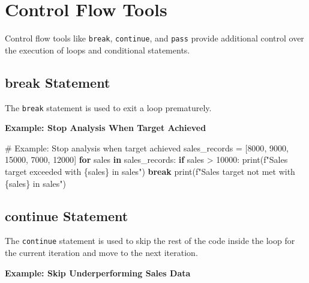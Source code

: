 \documentclass[
  letterpaper,
  DIV=11,
  numbers=noendperiod]{scrreprt}
\newenvironment{Shaded}{\begin{snugshade}}{\end{snugshade}}
\newcommand{\BuiltInTok}[1]{\textcolor[rgb]{0.00,0.23,0.31}{#1}}
\newcommand{\CommentTok}[1]{\textcolor[rgb]{0.37,0.37,0.37}{#1}}
\newcommand{\ControlFlowTok}[1]{\textcolor[rgb]{0.00,0.23,0.31}{\textbf{#1}}}
\newcommand{\DecValTok}[1]{\textcolor[rgb]{0.68,0.00,0.00}{#1}}
\newcommand{\KeywordTok}[1]{\textcolor[rgb]{0.00,0.23,0.31}{\textbf{#1}}}
\newcommand{\NormalTok}[1]{\textcolor[rgb]{0.00,0.23,0.31}{#1}}
\newcommand{\OperatorTok}[1]{\textcolor[rgb]{0.37,0.37,0.37}{#1}}
\newcommand{\SpecialCharTok}[1]{\textcolor[rgb]{0.37,0.37,0.37}{#1}}
\newcommand{\SpecialStringTok}[1]{\textcolor[rgb]{0.13,0.47,0.30}{#1}}
\begin{document}
\section{Control Flow Tools}\label{control-flow-tools}

Control flow tools like \texttt{break}, \texttt{continue}, and
\texttt{pass} provide additional control over the execution of loops and
conditional statements.

\subsection{break Statement}\label{break-statement}

The \texttt{break} statement is used to exit a loop prematurely.

\textbf{Example: Stop Analysis When Target Achieved}

\begin{Shaded}
\begin{Highlighting}[]
\CommentTok{\# Example: Stop analysis when target achieved}
\NormalTok{sales\_records }\OperatorTok{=}\NormalTok{ [}\DecValTok{8000}\NormalTok{, }\DecValTok{9000}\NormalTok{, }\DecValTok{15000}\NormalTok{, }\DecValTok{7000}\NormalTok{, }\DecValTok{12000}\NormalTok{]}
\ControlFlowTok{for}\NormalTok{ sales }\KeywordTok{in}\NormalTok{ sales\_records:}
    \ControlFlowTok{if}\NormalTok{ sales }\OperatorTok{\textgreater{}} \DecValTok{10000}\NormalTok{:}
        \BuiltInTok{print}\NormalTok{(}\SpecialStringTok{f"Sales target exceeded with }\SpecialCharTok{\{}\NormalTok{sales}\SpecialCharTok{\}}\SpecialStringTok{ in sales"}\NormalTok{)}
        \ControlFlowTok{break}
    \BuiltInTok{print}\NormalTok{(}\SpecialStringTok{f"Sales target not met with }\SpecialCharTok{\{}\NormalTok{sales}\SpecialCharTok{\}}\SpecialStringTok{ in sales"}\NormalTok{)}
\end{Highlighting}
\end{Shaded}

\subsection{continue Statement}\label{continue-statement}

The \texttt{continue} statement is used to skip the rest of the code
inside the loop for the current iteration and move to the next
iteration.

\textbf{Example: Skip Underperforming Sales Data}
\end{document}
